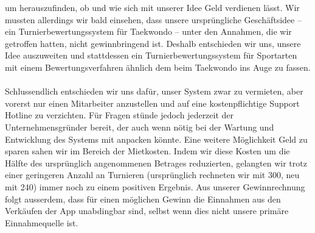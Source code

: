     um herauszufinden, ob und wie sich mit unserer Idee Geld verdienen lässt.
Wir mussten allerdings wir bald einsehen, dass unsere ursprüngliche Geschäftsidee – ein Turnierbewertungssystem für
    Taekwondo – unter den Annahmen, die wir getroffen hatten, nicht gewinnbringend ist.
Deshalb entschieden wir uns, unsere Idee auszuweiten und stattdessen ein Turnierbewertungssystem für Sportarten mit einem
    Bewertungsverfahren ähnlich dem beim Taekwondo ins Auge zu fassen.
\\\\
Schlussendlich entschieden wir uns dafür, unser System zwar zu vermieten, aber vorerst nur einen Mitarbeiter anzustellen
    und auf eine kostenpflichtige Support Hotline zu verzichten.
Für Fragen stünde jedoch jederzeit der Unternehmensgründer bereit, der auch wenn nötig bei der Wartung und Entwicklung
    des Systems mit anpacken könnte.
Eine weitere Möglichkeit Geld zu sparen sahen wir im Bereich der Mietkosten.
Indem wir diese Kosten um die Hälfte des ursprünglich angenommenen Betrages reduzierten, gelangten wir trotz einer
geringeren Anzahl an Turnieren (ursprünglich rechneten wir mit 300, neu mit 240) immer noch zu einem positiven Ergebnis.
Aus unserer Gewinnrechnung folgt ausserdem, dass für einen möglichen Gewinn die Einnahmen aus den Verkäufen der App unabdingbar sind,
    selbst wenn dies nicht unsere primäre Einnahmequelle ist.